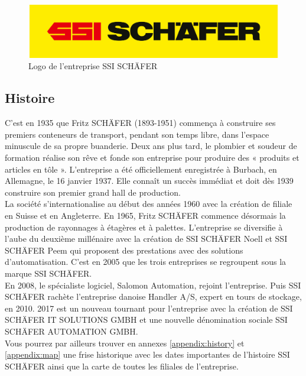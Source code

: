 \documentclass[a4paper, 12pt, french]{article}
\begin{document}
			\begin{figure}[h!]
				\begin{center}
					\includegraphics[width=0.7\linewidth]{images/schaefer.jpg}
				\end{center}
				\caption{Logo de l'entreprise SSI SCHÄFER}
				\label{fig:schaefer}
			\end{figure}	
			\newpage
			\subsection{Histoire}
				C'est en 1935 que Fritz SCHÄFER (1893-1951) commença à construire ses premiers conteneurs de transport, pendant son temps libre, dans l'espace minuscule de sa propre buanderie. Deux ans plus tard, le plombier et soudeur de formation réalise son rêve et fonde son entreprise pour produire des « produits et articles en tôle ». L'entreprise a été officiellement enregistrée à Burbach, en Allemagne, le 16 janvier 1937. Elle connaît un succès immédiat et doit dès 1939 construire son premier grand hall de production.\\

				La société s'internationalise au début des années 1960 avec la création de filiale en Suisse et en Angleterre. En 1965, Fritz SCHÄFER commence désormais la production de rayonnages à étagères et à palettes. L'entreprise se diversifie à l'aube du deuxième millénaire avec la création de SSI SCHÄFER Noell et SSI SCHÄFER Peem qui proposent des prestations avec des solutions d'automatisation. C'est en 2005 que les trois entreprises se regroupent sous la marque SSI SCHÄFER.\\

				En 2008, le spécialiste logiciel, Salomon Automation, rejoint l'entreprise. Puis SSI SCHÄFER rachète l'entreprise danoise Handler A/S, expert en tours de stockage, en 2010. 2017 est un nouveau tournant pour l'entreprise avec la création de SSI SCHÄFER IT SOLUTIONS GMBH et une nouvelle dénomination sociale SSI SCHÄFER AUTOMATION GMBH.\\
			
				Vous pourrez par ailleurs trouver en annexes \ref{appendix:history}  et \ref{appendix:map}  une frise historique avec les dates importantes de l'histoire SSI SCHÄFER ainsi que la carte de toutes les filiales de l'entreprise.
\end{document}
